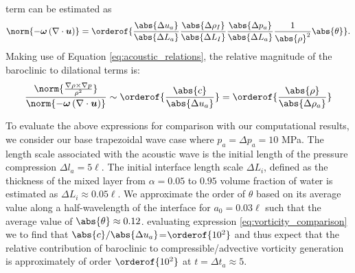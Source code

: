 term can be estimated as
\begin{align}
  \label{eq:compressible_advective_vorticity}%
  \norm{-\boldsymbol{\omega}\left(\nabla\cdot\boldsymbol{u}\right)} = %
  \orderof{%
  \frac{\abs{\Delta u_a}}{\abs{\Delta L_a}} \frac{\abs{\Delta \rho_I}}{\abs{\Delta L_I}}%
  \frac{\abs{\Delta p_a}}{\abs{\Delta L_a}} \frac{1}{\abs{\rho}^2}\abs{\theta}%
  }.%
\end{align}
%
Making use of Equation \eqref{eq:acoustic_relations}, the relative magnitude of the baroclinic to dilational terms is:
\begin{align} \label{eq:vorticity_comparison}
  \frac{\norm{\frac{\nabla\rho\times\nabla
  p}{\rho^2}}}{\norm{-\boldsymbol{\omega}\left(\nabla\cdot\boldsymbol{u}\right)}}
  \sim \orderof{\frac{\abs{c}}{\abs{\Delta u_a}}} = \orderof{\frac{\abs{\rho}}{\abs{\Delta \rho_a}}}%
\end{align}

To evaluate the above expressions for comparison with our
computational results, we consider our base trapezoidal wave case
where $p_a = \Delta p_a = 10$ MPa. The length scale associated with
the acoustic wave is the initial length of the pressure compression
$\Delta l_a=5\ell$. The initial interface length scale $\Delta L_i$,
defined as the thickness of the mixed layer from $\alpha=0.05$ to
$0.95$ volume fraction of water is estimated as
$\Delta L_i \approx 0.05\ell$. We approximate the order of $\theta$
based on its average value along a half-wavelength of the interface
for $a_0=0.03\ell$ such that the average value of
$\abs{\theta}\approx0.12$. evaluating expression
\eqref{eq:vorticity_comparison} we to find that
$\abs{c}/\abs{\Delta u_a}$=$\orderof{10^2}$ and thus expect that the relative
contribution of baroclinic to compressible/advective vorticity
generation is approximately of order $\orderof{10^2}$ at
$t = \Delta t_a \approx 5$.

